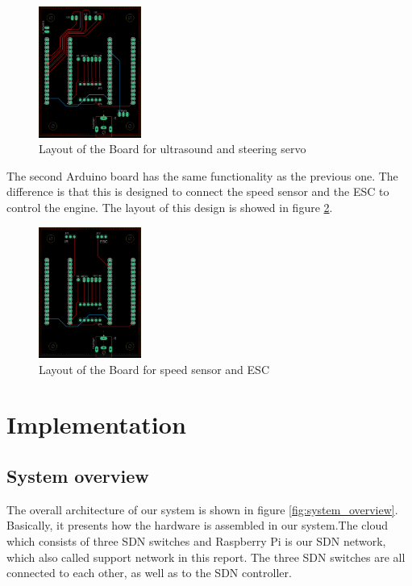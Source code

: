 \documentclass[11pt, titlepage]{article} %
\begin{document}
\begin{figure}
	\centering
	\includegraphics[width=0.3\textwidth]{borad_layout_seervo_ultra.png}
	\caption{Layout of the Board for ultrasound and steering servo}
	\label{fig:board_layout_ultra_servo}
\end{figure}

The second Arduino board has the same functionality as the previous one. The difference is that this is designed to connect the speed sensor and the ESC to control the engine. The layout of this design is showed in figure \ref{fig:board_layout_ir_esc}.

\begin{figure}
	\centering
	\includegraphics[width=0.3\textwidth]{borad_layout_ir_esc.png}
	\caption{Layout of the Board for speed sensor and ESC}
	\label{fig:board_layout_ir_esc}
\end{figure}


\clearpage
\section{Implementation}

\subsection{System overview}
The overall architecture of our system is shown in figure \ref{fig:system_overview}. Basically, it presents how the hardware is assembled in our system.The cloud which consists of three SDN switches and Raspberry Pi is our SDN network, which also called support network in this report. The three SDN switches are all connected to each other, as well as to the SDN controller.
\end{document}
